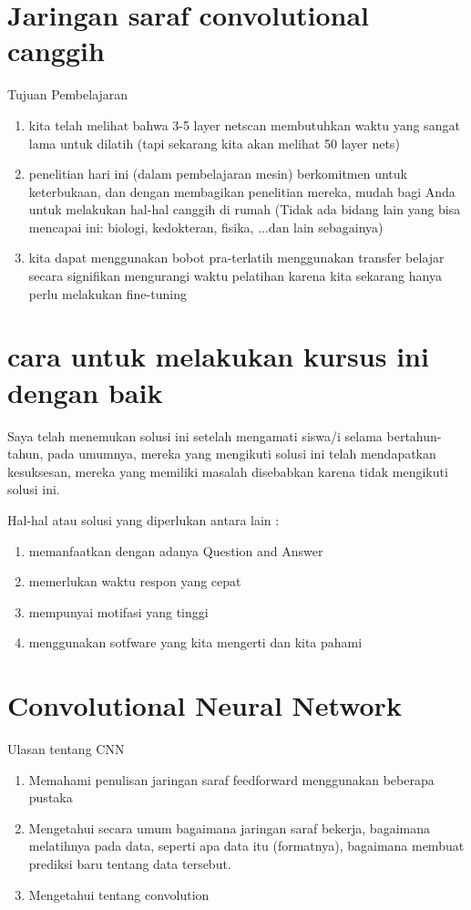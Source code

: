 \section{Jaringan saraf convolutional canggih}
Tujuan Pembelajaran
\begin{enumerate}

\item  kita telah melihat bahwa 3-5 layer netscan membutuhkan waktu yang sangat lama untuk dilatih
(tapi sekarang kita akan melihat 50 layer nets)
\item penelitian hari ini (dalam pembelajaran mesin) berkomitmen untuk keterbukaan, dan dengan membagikan penelitian mereka, mudah bagi Anda untuk melakukan hal-hal canggih di rumah
(Tidak ada bidang lain yang bisa mencapai ini: biologi, kedokteran, fisika, ...dan lain sebagainya)
\item kita dapat menggunakan bobot pra-terlatih menggunakan transfer belajar secara signifikan mengurangi waktu pelatihan karena kita sekarang hanya perlu melakukan fine-tuning
\end{enumerate}

\section{cara untuk melakukan kursus ini dengan baik}
Saya telah menemukan solusi ini setelah mengamati siswa/i selama bertahun-tahun,
pada umumnya, mereka yang mengikuti solusi ini telah mendapatkan kesuksesan, mereka yang memiliki masalah disebabkan karena tidak mengikuti solusi ini.

Hal-hal atau solusi yang diperlukan antara lain :
\begin{enumerate}
\item memanfaatkan dengan adanya Question and Answer  
\item memerlukan waktu respon yang cepat
\item mempunyai motifasi yang tinggi
\item menggunakan sotfware yang kita mengerti dan kita pahami 
\end {enumerate}

\section{Convolutional Neural Network}
Ulasan tentang CNN
\begin{enumerate}

\item Memahami penulisan jaringan saraf feedforward menggunakan beberapa pustaka
\item Mengetahui secara umum bagaimana jaringan saraf bekerja, bagaimana melatihnya pada data, seperti apa data itu (formatnya), bagaimana membuat prediksi baru tentang data tersebut.
\item Mengetahui tentang convolution
\end{enumerate}

